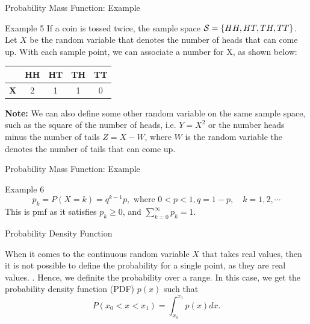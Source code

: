\documentclass[aspectratio=169,xcolor=dvipsnames,svgnames,x11names,fleqn]{beamer}
\begin{document}
\begin{frame}[containsverbatim]{Probability Mass Function: Example}
    
    
    \begin{exampleblock}{Example 5}
    If a coin is tossed twice, the sample space ${\mathcal S} = \{HH, HT, TH, TT\}$. Let $X$ be the random variable that denotes the number of heads that can come up. With each sample point, we can associate a number for X, as shown below:
    
    \begin{tabular}{|c|c|c|c|c|}
    \hline
     & \textbf{HH} & \textbf{HT} & \textbf{TH} & \textbf{TT} \\
    \hline
    \textbf{X} & 2 & 1 & 1 & 0 \\
    \hline
    \end{tabular}
    \newline
    \newline
    \textbf{Note:} We can also define some other random variable on the same sample space, such as the square of the number of heads, i.e. $Y = X^2$ or the number heads minus the number of tails $Z = X - W$, where $W$ is the random variable the denotes the number of tails that can come up.
    \end{exampleblock}

\end{frame}

\begin{frame}[containsverbatim]{Probability Mass Function: Example}
    
    
    \begin{exampleblock}{Example 6}
        \begin{equation}
            p_k = P(X = k) = q^{k-1} p, \text{~where~} 0 < p < 1 , q = 1 - p, \quad k = 1, 2, \cdots
        \end{equation}
        This is pmf as it satisfies $p_k \geq 0$, and $\sum_{k=0}^\infty p_k = 1.$
    \end{exampleblock}

\end{frame}

\begin{frame}[containsverbatim]{Probability Density Function}
    
    
    When it comes to the continuous random variable $X$ that takes real values, then it is not possible to define the probability for a single point, as they are real values. {\color{red}{At what real value we should define a probability -- there can be a possibility of an infinite number after a decimal point!!!}. }
    Hence, we definite the probability over a range. In this case, we get the probability density function (PDF) $p(x)$ such that 
    \begin{equation}
        P(x_0 < x < x_1) = \int_{x_0}^{x_1} p(x)dx.
    \end{equation}

\end{frame}
\end{document}
